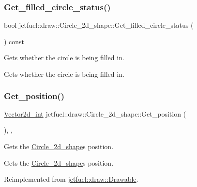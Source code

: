 \subsubsection{\texorpdfstring{Get\+\_\+filled\+\_\+circle\+\_\+status()}{Get\_filled\_circle\_status()}}
{\footnotesize\ttfamily bool jetfuel\+::draw\+::\+Circle\+\_\+2d\+\_\+shape\+::\+Get\+\_\+filled\+\_\+circle\+\_\+status (\begin{DoxyParamCaption}{ }\end{DoxyParamCaption}) const\hspace{0.3cm}{\ttfamily [inline]}}



Gets whether the circle is being filled in. 

Gets whether the circle is being filled in. \mbox{\label{classjetfuel_1_1draw_1_1Circle__2d__shape_a99b93544660c7f5b11cf8f0169e8fec1}} 
\subsubsection{\texorpdfstring{Get\+\_\+position()}{Get\_position()}}
{\footnotesize\ttfamily \hyperlink{classjetfuel_1_1draw_1_1Vector2d}{Vector2d\+\_\+int} jetfuel\+::draw\+::\+Circle\+\_\+2d\+\_\+shape\+::\+Get\+\_\+position (\begin{DoxyParamCaption}{ }\end{DoxyParamCaption})\hspace{0.3cm}{\ttfamily [inline]}, {\ttfamily [override]}, {\ttfamily [virtual]}}



Gets the \hyperlink{classjetfuel_1_1draw_1_1Circle__2d__shape}{Circle\+\_\+2d\+\_\+shape}\textquotesingle{}s position. 

Gets the \hyperlink{classjetfuel_1_1draw_1_1Circle__2d__shape}{Circle\+\_\+2d\+\_\+shape}\textquotesingle{}s position. 

Reimplemented from \hyperlink{classjetfuel_1_1draw_1_1Drawable_ae7ebd30d66db2c8a5d5371cbcf0023fc}{jetfuel\+::draw\+::\+Drawable}.

\mbox{\label{classjetfuel_1_1draw_1_1Circle__2d__shape_ae3686026f21348b28769d7a89f59c071}} 
